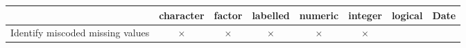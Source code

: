 \documentclass[]{article}
\begin{document}
\begin{longtable}[]{@{}lccccccc@{}}
\toprule
\begin{minipage}[b]{0.33\columnwidth}\raggedright
~\strut
\end{minipage} & \begin{minipage}[b]{0.07\columnwidth}\centering
character\strut
\end{minipage} & \begin{minipage}[b]{0.07\columnwidth}\centering
factor\strut
\end{minipage} & \begin{minipage}[b]{0.07\columnwidth}\centering
labelled\strut
\end{minipage} & \begin{minipage}[b]{0.07\columnwidth}\centering
numeric\strut
\end{minipage} & \begin{minipage}[b]{0.07\columnwidth}\centering
integer\strut
\end{minipage} & \begin{minipage}[b]{0.06\columnwidth}\centering
logical\strut
\end{minipage} & \begin{minipage}[b]{0.06\columnwidth}\centering
Date\strut
\end{minipage}\tabularnewline
\midrule
\endhead
\begin{minipage}[t]{0.33\columnwidth}\raggedright
Identify miscoded missing values\strut
\end{minipage} & \begin{minipage}[t]{0.07\columnwidth}\centering
\(\times\)\strut
\end{minipage} & \begin{minipage}[t]{0.07\columnwidth}\centering
\(\times\)\strut
\end{minipage} & \begin{minipage}[t]{0.07\columnwidth}\centering
\(\times\)\strut
\end{minipage} & \begin{minipage}[t]{0.07\columnwidth}\centering
\(\times\)\strut
\end{minipage} & \begin{minipage}[t]{0.07\columnwidth}\centering
\(\times\)\strut
\end{minipage} & \begin{minipage}[t]{0.06\columnwidth}\centering
\strut
\end{minipage} & \begin{minipage}[t]{0.06\columnwidth}\centering

\end{minipage}
\end{longtable}
\end{document}
